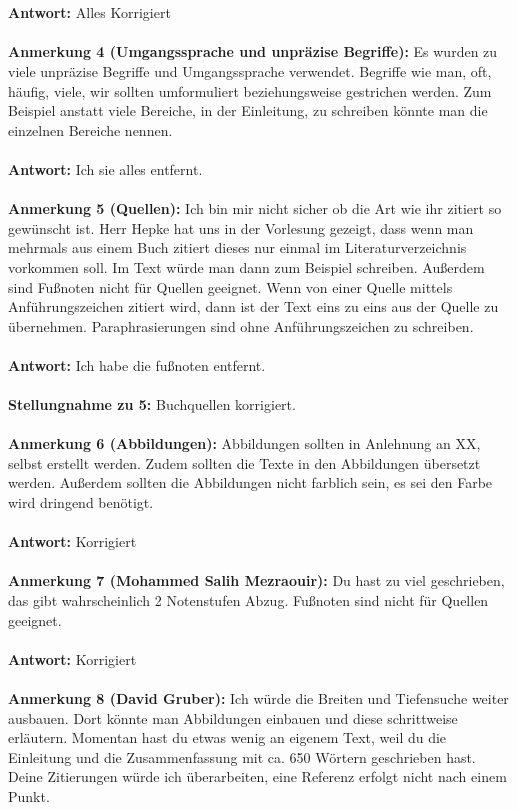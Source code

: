 \documentclass[a4paper,12pt]{book}
\begin{document}
\\ \\
\textbf{Antwort:} Alles Korrigiert
\\
\\
\textbf{Anmerkung 4 (Umgangssprache und unpräzise Begriffe):}
Es wurden zu viele unpräzise Begriffe und Umgangssprache verwendet. Begriffe wie \glqq man, oft, häufig, viele, wir\grqq{} sollten umformuliert beziehungsweise gestrichen werden. Zum Beispiel anstatt \glqq viele Bereiche\grqq{}, in der Einleitung, zu schreiben könnte man die einzelnen Bereiche nennen. 
\\ \\
\textbf{Antwort:} Ich sie alles entfernt.
\\ \\
\textbf{Anmerkung 5 (Quellen):}
Ich bin mir nicht sicher ob die Art wie ihr zitiert so gewünscht ist. Herr Hepke hat uns in der Vorlesung gezeigt, dass wenn man mehrmals aus einem Buch zitiert dieses nur einmal 
im Literaturverzeichnis vorkommen soll. Im Text würde man dann zum Beispiel  \glqq [RN10, 92-102]\grqq{} schreiben. Außerdem sind Fußnoten nicht für Quellen geeignet. 
Wenn von einer Quelle mittels Anführungszeichen zitiert wird, dann ist der Text eins zu eins aus der Quelle zu übernehmen. Paraphrasierungen sind ohne Anführungszeichen zu schreiben. 
\\ \\
\textbf{Antwort:} Ich habe die fußnoten entfernt.
\\ \\
\textbf{Stellungnahme zu 5:}
Buchquellen korrigiert.
\\ \\ 
\textbf{Anmerkung 6 (Abbildungen):}
Abbildungen sollten in Anlehnung an XX, selbst erstellt werden. Zudem sollten die Texte in den Abbildungen übersetzt werden.  
Außerdem sollten die Abbildungen nicht farblich sein, es sei den Farbe wird dringend benötigt.
 \\  \\
\textbf{Antwort:} Korrigiert
\\ \\
\textbf{Anmerkung 7 (Mohammed Salih Mezraouir):}
Du hast zu viel geschrieben, das gibt wahrscheinlich 2 Notenstufen Abzug. Fußnoten sind nicht für Quellen geeignet.
 \\  \\
\textbf{Antwort:} Korrigiert
\\ \\
\textbf{Anmerkung 8 (David Gruber):}
Ich würde die Breiten und Tiefensuche weiter ausbauen. Dort könnte man Abbildungen einbauen und diese schrittweise erläutern. Momentan hast du etwas wenig an eigenem Text, weil du die Einleitung und die Zusammenfassung mit ca. 650 Wörtern geschrieben hast. Deine Zitierungen würde ich überarbeiten, eine Referenz erfolgt nicht nach einem Punkt. 
\end{document}
